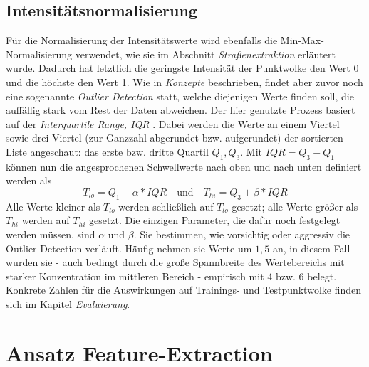 \subsection{Intensitätsnormalisierung}

Für die Normalisierung der Intensitätswerte wird ebenfalls die Min-Max-Normalisierung verwendet, wie sie im Abschnitt \textit{Straßenextraktion} erläutert wurde. Dadurch hat letztlich die geringste Intensität der Punktwolke den Wert 0 und die höchste den Wert 1. Wie in \textit{Konzepte} beschrieben, findet aber zuvor noch eine sogenannte \textit{Outlier Detection} statt, welche diejenigen Werte finden soll, die auffällig stark vom Rest der Daten abweichen. Der hier genutzte Prozess basiert auf der \textit{Interquartile Range, IQR} \citep{Rousseeuw.Hubert-2011}. Dabei werden die Werte an einem Viertel sowie drei Viertel (zur Ganzzahl abgerundet bzw. aufgerundet) der sortierten Liste angeschaut: das erste bzw. dritte Quartil $Q_1, Q_3$. Mit $IQR = Q_3 - Q_1$ können nun die angesprochenen Schwellwerte nach oben und nach unten definiert werden als
\begin{equation}
T_{lo} = Q_1 - \alpha * IQR  
    \quad\text{und}\quad 
T_{hi} = Q_3 + \beta * IQR
\end{equation}
Alle Werte kleiner als $T_{lo}$ werden schließlich auf $T_{lo}$ gesetzt; alle Werte größer als $T_{hi}$ werden auf $T_{hi}$ gesetzt. Die einzigen Parameter, die dafür noch festgelegt werden müssen, sind $\alpha$ und $\beta$. Sie bestimmen, wie vorsichtig oder aggressiv die Outlier Detection verläuft. Häufig nehmen sie Werte um $1,5$ an, in diesem Fall wurden sie - auch bedingt durch die große Spannbreite des Wertebereichs mit starker Konzentration im mittleren Bereich - empirisch mit 4 bzw. 6 belegt. Konkrete Zahlen für die Auswirkungen auf Trainings- und Testpunktwolke finden sich im Kapitel \textit{Evaluierung}.

\section{Ansatz Feature-Extraction} 


